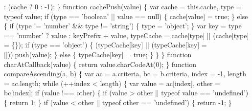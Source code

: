 \begin{DoxyCodeInclude}
\textcolor{stringliteral}{      : (cache ? 0 : -1);}
\textcolor{stringliteral}{  \}}
\textcolor{stringliteral}{}
\textcolor{stringliteral}{  function cachePush(value) \{}
\textcolor{stringliteral}{    var cache = this.cache,}
\textcolor{stringliteral}{        type = typeof value;}
\textcolor{stringliteral}{}
\textcolor{stringliteral}{    if (type == '}\textcolor{keywordtype}{boolean}\textcolor{stringliteral}{' || value == null) \{}
\textcolor{stringliteral}{      cache[value] = true;}
\textcolor{stringliteral}{    \} else \{}
\textcolor{stringliteral}{      if (type != '}number\textcolor{stringliteral}{' && type != '}\textcolor{keywordtype}{string}\textcolor{stringliteral}{') \{}
\textcolor{stringliteral}{        type = '}\textcolor{keywordtype}{object}\textcolor{stringliteral}{';}
\textcolor{stringliteral}{      \}}
\textcolor{stringliteral}{      var key = type == '}number\textcolor{stringliteral}{' ? value : keyPrefix + value,}
\textcolor{stringliteral}{          typeCache = cache[type] || (cache[type] = \{\});}
\textcolor{stringliteral}{}
\textcolor{stringliteral}{      if (type == '}\textcolor{keywordtype}{object}\textcolor{stringliteral}{') \{}
\textcolor{stringliteral}{        (typeCache[key] || (typeCache[key] = [])).push(value);}
\textcolor{stringliteral}{      \} else \{}
\textcolor{stringliteral}{        typeCache[key] = true;}
\textcolor{stringliteral}{      \}}
\textcolor{stringliteral}{    \}}
\textcolor{stringliteral}{  \}}
\textcolor{stringliteral}{}
\textcolor{stringliteral}{  function charAtCallback(value) \{}
\textcolor{stringliteral}{    return value.charCodeAt(0);}
\textcolor{stringliteral}{  \}}
\textcolor{stringliteral}{}
\textcolor{stringliteral}{  function compareAscending(a, b) \{}
\textcolor{stringliteral}{    var ac = a.criteria,}
\textcolor{stringliteral}{        bc = b.criteria,}
\textcolor{stringliteral}{        index = -1,}
\textcolor{stringliteral}{        length = ac.length;}
\textcolor{stringliteral}{}
\textcolor{stringliteral}{    while (++index < length) \{}
\textcolor{stringliteral}{      var value = ac[index],}
\textcolor{stringliteral}{          other = bc[index];}
\textcolor{stringliteral}{}
\textcolor{stringliteral}{      if (value !== other) \{}
\textcolor{stringliteral}{        if (value > other || typeof value == '}undefined\textcolor{stringliteral}{') \{}
\textcolor{stringliteral}{          return 1;}
\textcolor{stringliteral}{        \}}
\textcolor{stringliteral}{        if (value < other || typeof other == '}undefined\textcolor{stringliteral}{') \{}
\textcolor{stringliteral}{          return -1;}
\textcolor{stringliteral}{        \}}

\end{DoxyCodeInclude}
